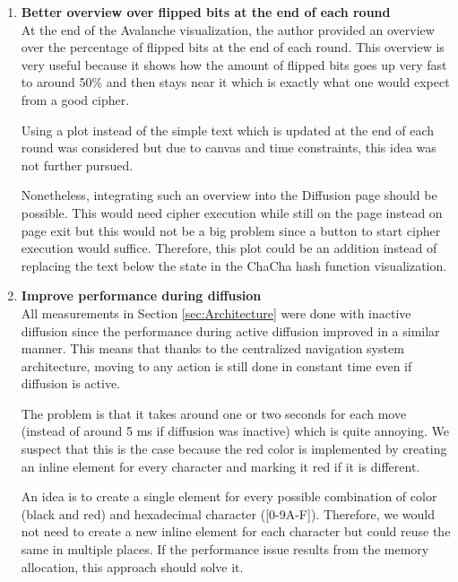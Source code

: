 \begin{enumerate}[wide, labelwidth=!, labelindent=0pt]
\setlength{\parskip}{0pt}

\item \textbf{Better overview over flipped bits at the end of each round}\\
At the end of the Avalanche visualization, the author provided an overview over the percentage of flipped bits at the end of each round. This overview is very useful because it shows how the amount of flipped bits goes up very fast to around 50\% and then stays near it which is exactly what one would expect from a good cipher.

Using a plot instead of the simple text which is updated at the end of each round was considered but due to canvas and time constraints, this idea was not further pursued. 

Nonetheless, integrating such an overview into the Diffusion page should be possible. This would need cipher execution while still on the page instead on page exit but this would not be a big problem since a button to start cipher execution would suffice. Therefore, this plot could be an addition instead of replacing the text below the state in the ChaCha hash function visualization.

\vfill
\pagebreak

\item \textbf{Improve performance during diffusion}\\
All measurements in Section \autoref{sec:Architecture} were done with inactive diffusion since the performance during active diffusion improved in a similar manner. This means that thanks to the centralized navigation system architecture, moving to any action is still done in constant time even if diffusion is active.

The problem is that it takes around one or two seconds for each move (instead of around 5 ms if diffusion was inactive) which is quite annoying. We suspect that this is the case because the red color is implemented by creating an inline element for every character and marking it red if it is different.

An idea is to create a single element for every possible combination of color (black and red) and hexadecimal character ([0-9A-F]). Therefore, we would not need to create a new inline element for each character but could reuse the same in multiple places. If the performance issue results from the memory allocation, this approach should solve it. 


\end{enumerate}

